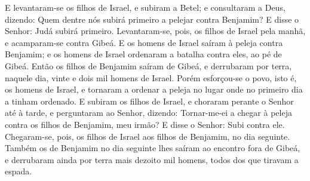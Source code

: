 E levantaram-se os filhos de Israel, e subiram a Betel; e
consultaram a Deus, dizendo: Quem dentre nós subirá primeiro a
pelejar contra Benjamim? E disse o Senhor: Judá subirá primeiro.
Levantaram-se, pois, os filhos de Israel pela manhã, e
acamparam-se contra Gibeá. E os homens de Israel saíram à
peleja contra Benjamim; e os homens de Israel ordenaram a batalha
contra eles, ao pé de Gibeá. Então os filhos de Benjamim
saíram de Gibeá, e derrubaram por terra, naquele dia, vinte e dois
mil homens de Israel. Porém esforçou-se o povo, isto é, os
homens de Israel, e tornaram a ordenar a peleja no lugar onde no
primeiro dia a tinham ordenado. E subiram os filhos de
Israel, e choraram perante o Senhor até à tarde, e perguntaram ao
Senhor, dizendo: Tornar-me-ei a chegar à peleja contra os filhos de
Benjamim, meu irmão? E disse o Senhor: Subi contra ele.
Chegaram-se, pois, os filhos de Israel aos filhos de
Benjamim, no dia seguinte. Também os de Benjamim no dia
seguinte lhes saíram ao encontro fora de Gibeá, e derrubaram ainda
por terra mais dezoito mil homens, todos dos que tiravam a espada.

